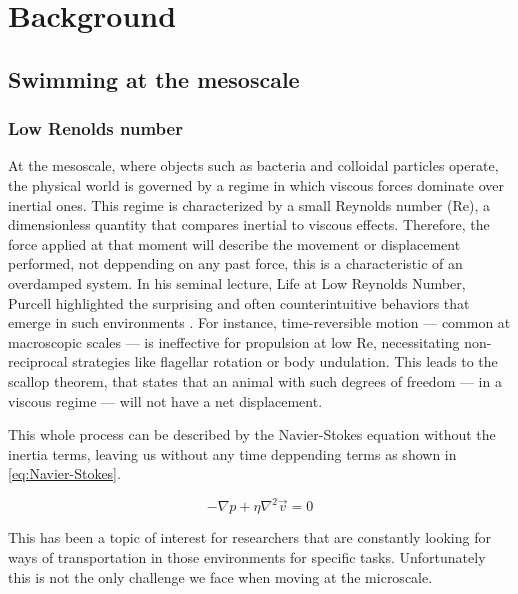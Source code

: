 



\part{Background}
\label{part:background}

\chapter{Swimming at the mesoscale}
\label{ch:swimming at the mesoscale}


\section{Low Renolds number}

At the mesoscale, where objects such as bacteria and colloidal particles operate, the physical world is governed by a regime in which viscous forces dominate over inertial ones. This regime is characterized by a small Reynolds number (Re), a dimensionless quantity that compares inertial to viscous effects. Therefore, the force applied at that moment will describe the movement or displacement performed, not deppending on any past force, this is a characteristic of an overdamped system. In his seminal lecture, Life at Low Reynolds Number, Purcell highlighted the surprising and often counterintuitive behaviors that emerge in such environments \cite{purcell2014life}. For instance, time-reversible motion — common at macroscopic scales — is ineffective for propulsion at low Re, necessitating non-reciprocal strategies like flagellar rotation or body undulation. This leads to the scallop theorem, that states that an animal with such degrees of freedom — in a viscous regime — will not have a net displacement. 

This whole process can be described by the Navier-Stokes equation without the inertia terms, leaving us without any time deppending terms as shown in \ref{eq:Navier-Stokes}. 

\begin{equation}
  - \nabla p + \eta \nabla ^2 \vec{v} = 0
  \label{eq:Navier-Stokes}
\end{equation}

This has been a topic of interest for researchers that are constantly looking for ways of transportation in those environments for specific tasks. Unfortunately this is not the only challenge we face when moving at the microscale.

